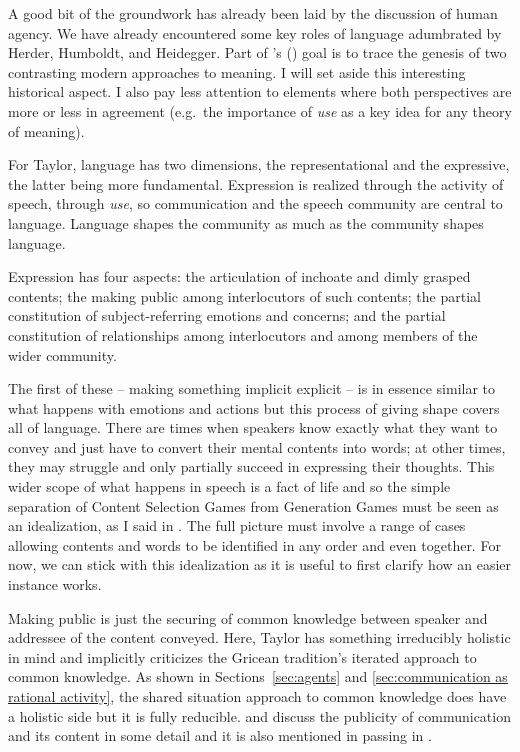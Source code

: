 A good bit of the groundwork has already been laid by the discussion of human agency. We have already encountered some key roles of language adumbrated by Herder, Humboldt, and Heidegger. Part of \citeauthor{taylor:lhn}'s (\citeyear{taylor:lhn, taylor:tm}) goal is to trace the genesis of two contrasting modern approaches to meaning. I will set aside this interesting historical aspect. I also pay less attention to elements where both perspectives are more or less in agreement (e.g.\ the importance of \emph{use} as a key idea for any theory of meaning).

For Taylor, language has two dimensions, the representational and the expressive, the latter being more fundamental. Expression is realized through the activity of speech, through \emph{use}, so communication and the speech community are central to language. Language shapes the community as much as the community shapes language.

Expression has four aspects: the articulation of inchoate and dimly grasped contents; the making public among interlocutors of such contents; the partial constitution of subject-referring emotions and concerns; and the partial constitution of relationships among interlocutors and among members of the wider community. 

The first of these -- making something implicit explicit -- is in essence similar to what happens with emotions and actions but this process of giving shape covers all of language. There are times when speakers know exactly what they want to convey and just have to convert their mental contents into words; at other times, they may struggle and only partially succeed in expressing their thoughts. This wider scope of what happens in speech is a fact of life and so the simple separation of Content Selection Games from Generation Games must be seen as an idealization, as I said in . The full picture must involve a range of cases allowing contents and words to be identified in any order and even together. For now, we can stick with this idealization as it is useful to first clarify how an easier instance works.

Making public is just the securing of common knowledge between speaker and addressee of the content conveyed. Here, Taylor has something irreducibly holistic in mind and implicitly criticizes the Gricean tradition's iterated approach to common knowledge. As shown in Sections~\ref{sec:agents} and \ref{sec:communication as rational activity}, the shared situation approach to common knowledge does have a holistic side but it is fully reducible. \citet[Section~6.4]{parikh:ul} and \citet[225]{parikh:le} discuss the publicity of communication and its content in some detail and it is also mentioned in passing in .

